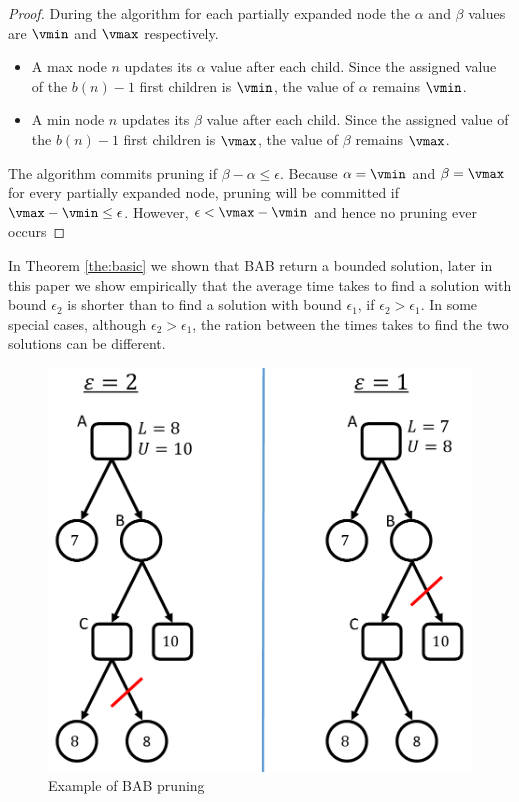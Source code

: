 \begin{proof}
During the algorithm for each partially expanded node the $\alpha$ and $\beta$ values are $\vmin$ and $\vmax$ respectively.
\begin{itemize}
  \item A max node $n$ updates its $\alpha$ value after each child. Since the assigned value of the $b(n)-1$ first children is $\vmin$, the value of $\alpha$ remains $\vmin$.
  \item A min node $n$ updates its $\beta$ value after each child. Since the assigned value of the $b(n)-1$ first children is $\vmax$, the value of $\beta$ remains $\vmax$.
\end{itemize}
The algorithm commits pruning if $\beta - \alpha \leq \epsilon$. Because $\alpha = \vmin$ and $\beta = \vmax$ for every partially expanded node, pruning will be committed if $\vmax - \vmin \leq \epsilon$. However, $\epsilon < \vmax - \vmin$ and hence no pruning ever occurs
\end{proof}

In Theorem \ref{the:basic} we shown that BAB return a bounded solution, later in this paper we show empirically that the average time takes to find a solution with bound $\epsilon_2$ is shorter than to find a solution with bound $\epsilon_1$, if $\epsilon_2 > \epsilon_1$. In some special cases, although $\epsilon_2 > \epsilon_1$, the ration between the times takes to find the two solutions can be different. 


\begin{figure}
	\centering
	\includegraphics[width=0.8\columnwidth]{Figures/cropped_example_different_e.pdf}
	\caption{Example of BAB pruning}
	\label{fig:bab-prune}
\end{figure}

